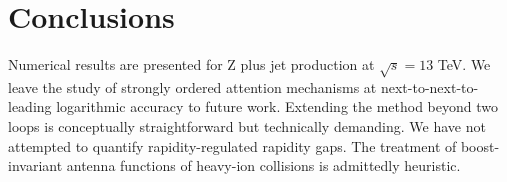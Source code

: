 \section{Conclusions}\label{sec:conclusions}

Numerical results are presented for Z plus jet production at $\sqrt{s} =
13$ TeV. We leave the study of strongly ordered attention mechanisms at
next-to-next-to-leading logarithmic accuracy to future work. Extending
the method beyond two loops is conceptually straightforward but
technically demanding. We have not attempted to quantify
rapidity-regulated rapidity gaps. The treatment of boost-invariant
antenna functions of heavy-ion collisions is admittedly heuristic.

